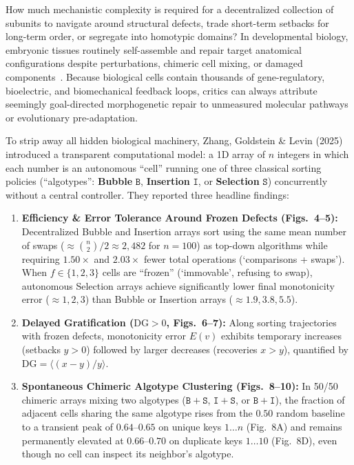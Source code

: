 \documentclass[11pt,a4paper]{article}
\theoremstyle{definition}
\theoremstyle{remark}
\newcommand{\DG}{\mathrm{DG}}
\begin{document}
How much mechanistic complexity is required for a decentralized collection of subunits to navigate around structural defects, trade short-term setbacks for long-term order, or segregate into homotypic domains? In developmental biology, embryonic tissues routinely self-assemble and repair target anatomical configurations despite perturbations, chimeric cell mixing, or damaged components~\cite{Levin2024BioEssays,McMillenLevin2024}. Because biological cells contain thousands of gene-regulatory, bioelectric, and biomechanical feedback loops, critics can always attribute seemingly goal-directed morphogenetic repair to unmeasured molecular pathways or evolutionary pre-adaptation.

To strip away all hidden biological machinery, Zhang, Goldstein \& Levin (2025)~\cite{ZhangGoldsteinLevin2025} introduced a transparent computational model: a 1D array of $n$ integers in which each number is an autonomous ``cell'' running one of three classical sorting policies (``algotypes'': \textbf{Bubble} $\mathtt{B}$, \textbf{Insertion} $\mathtt{I}$, or \textbf{Selection} $\mathtt{S}$) concurrently without a central controller. They reported three headline findings:
\begin{enumerate}
  \item \textbf{Efficiency \& Error Tolerance Around Frozen Defects (Figs.~4--5):} Decentralized Bubble and Insertion arrays sort using the same mean number of swaps ($\approx \binom{n}{2}/2 \approx 2,482$ for $n=100$) as top-down algorithms while requiring $1.50\times$ and $2.03\times$ fewer total operations (`comparisons + swaps'). When $f \in \{1, 2, 3\}$ cells are ``frozen'' (`immovable', refusing to swap), autonomous Selection arrays achieve significantly lower final monotonicity error ($\approx 1, 2, 3$) than Bubble or Insertion arrays ($\approx 1.9, 3.8, 5.5$).
  \item \textbf{Delayed Gratification ($\DG > 0$, Figs.~6--7):} Along sorting trajectories with frozen defects, monotonicity error $E(v)$ exhibits temporary increases (setbacks $y > 0$) followed by larger decreases (recoveries $x > y$), quantified by $\DG = \langle (x - y)/y \rangle$.
  \item \textbf{Spontaneous Chimeric Algotype Clustering (Figs.~8--10):} In 50/50 chimeric arrays mixing two algotypes ($\mathtt{B+S}$, $\mathtt{I+S}$, or $\mathtt{B+I}$), the fraction of adjacent cells sharing the same algotype rises from the $0.50$ random baseline to a transient peak of $0.64\text{--}0.65$ on unique keys $1 \dots n$ (Fig.~8A) and remains permanently elevated at $0.66\text{--}0.70$ on duplicate keys $1 \dots 10$ (Fig.~8D), even though no cell can inspect its neighbor's algotype.
\end{enumerate}
\end{document}
